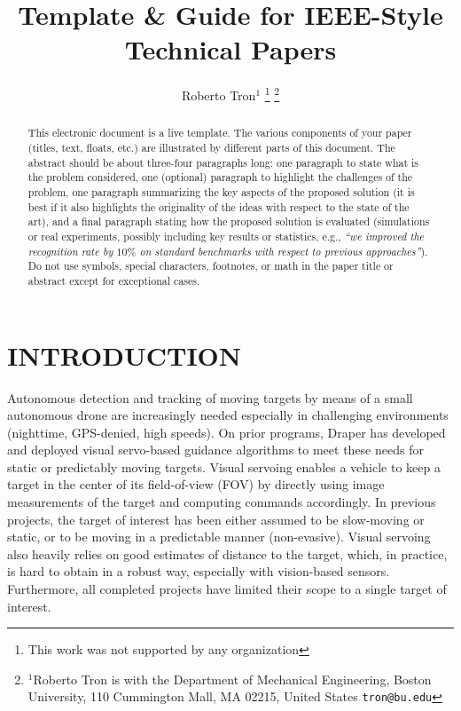 \documentclass[letterpaper, 10 pt, conference]{ieeeconf}
\title{\LARGE \bf
Template \& Guide for IEEE-Style Technical Papers
}
\author{Roberto Tron$^{1}$%
\thanks{This work was not supported by any organization}%
\thanks{$^{1}$Roberto Tron is with the Department of Mechanical Engineering,
        Boston University, 110 Cummington Mall, MA 02215, United States
        {\tt\small tron@bu.edu}}%
}
\begin{document}
\maketitle
\thispagestyle{empty}
\pagestyle{empty}


\begin{abstract}

  This electronic document is a live template. The various components of your paper (titles, text, floats, etc.) are illustrated by different parts of this document.
  The abstract should be about three-four paragraphs long: one paragraph to state what is the problem considered, one (optional) paragraph to highlight the challenges of the problem, one paragraph summarizing the key aspects of the proposed solution (it is best if it also highlights the originality of the ideas with respect to the state of the art), and a final paragraph stating how the proposed solution is evaluated (simulations or real experiments, possibly including key results or statistics, e.g., \emph{``we improved the recognition rate by $10\%$ on standard benchmarks with respect to previous approaches''}).
  Do not use symbols, special characters, footnotes, or math in the paper title or abstract except for exceptional cases.
\end{abstract}



\section{INTRODUCTION}

Autonomous detection and tracking of moving targets by means of a small autonomous drone are increasingly needed especially in challenging environments (nighttime, GPS-denied, high speeds). On prior programs, Draper has developed and deployed visual servo-based guidance algorithms to meet these needs for static or predictably moving targets. Visual servoing enables a vehicle to keep a target in the center of its field-of-view (FOV) by directly using image measurements of the target and computing commands accordingly. In previous projects, the target of interest has been either assumed to be slow-moving or static, or to be moving in a predictable manner (non-evasive). Visual servoing also heavily relies on good estimates of distance to the target, which, in practice, is hard to obtain in a robust way, especially with vision-based sensors. Furthermore, all completed projects have limited their scope to a single target of interest.
\end{document}
